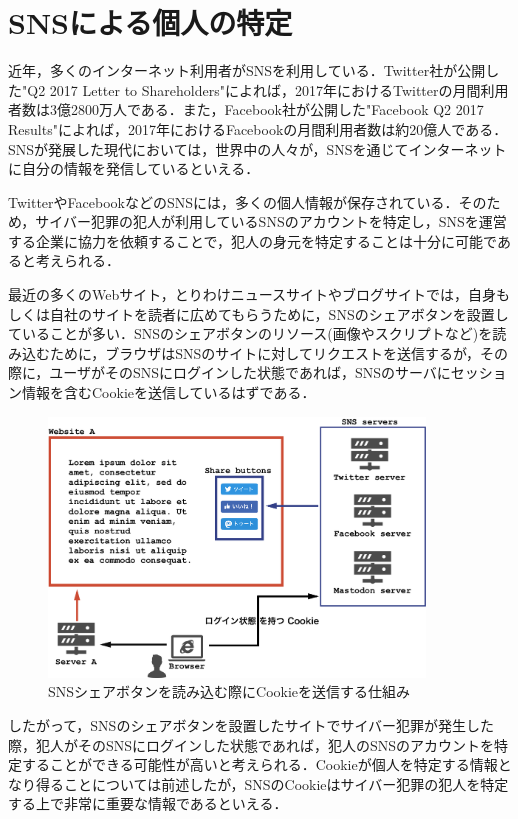 \documentclass[10pt, a4paper]{jreport}
\begin{document}
\section{SNSによる個人の特定}
近年，多くのインターネット利用者がSNSを利用している\cite{many_people_use_sns}．Twitter社が公開した"Q2 2017 Letter to Shareholders"によれば，2017年におけるTwitterの月間利用者数は3億2800万人である\cite{many_people_use_twitter}．また，Facebook社が公開した"Facebook Q2 2017 Results"によれば，2017年におけるFacebookの月間利用者数は約20億人である\cite{many_people_use_facebook}．SNSが発展した現代においては，世界中の人々が，SNSを通じてインターネットに自分の情報を発信しているといえる．

TwitterやFacebookなどのSNSには，多くの個人情報が保存されている．そのため，サイバー犯罪の犯人が利用しているSNSのアカウントを特定し，SNSを運営する企業に協力を依頼することで，犯人の身元を特定することは十分に可能であると考えられる．

最近の多くのWebサイト，とりわけニュースサイトやブログサイトでは，自身もしくは自社のサイトを読者に広めてもらうために，SNSのシェアボタンを設置していることが多い．SNSのシェアボタンのリソース(画像やスクリプトなど)を読み込むために，ブラウザはSNSのサイトに対してリクエストを送信するが，その際に，ユーザがそのSNSにログインした状態であれば，SNSのサーバにセッション情報を含むCookieを送信しているはずである．

\begin{figure}[H]
	\begin{center}
		\includegraphics[width=100mm]{figures/proposed_system.pdf}
	\end{center}
	\caption{SNSシェアボタンを読み込む際にCookieを送信する仕組み}
	\label{fig: proposed_system}
\end{figure}

したがって，SNSのシェアボタンを設置したサイトでサイバー犯罪が発生した際，犯人がそのSNSにログインした状態であれば，犯人のSNSのアカウントを特定することができる可能性が高いと考えられる．Cookieが個人を特定する情報となり得ることについては前述したが，SNSのCookieはサイバー犯罪の犯人を特定する上で非常に重要な情報であるといえる．
\end{document}
